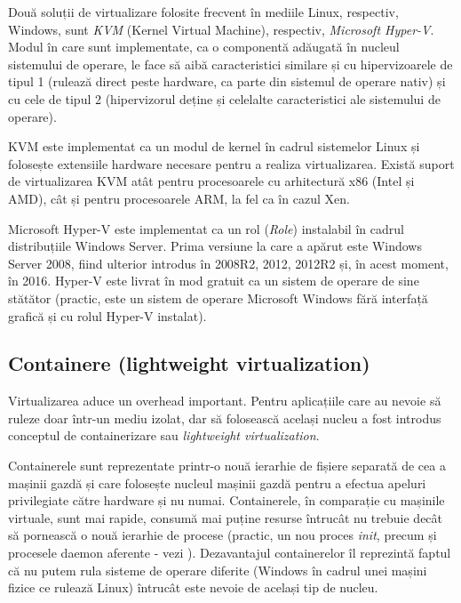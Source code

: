 Două soluții de virtualizare folosite frecvent în mediile Linux,
respectiv, Windows, sunt \textit{KVM}  (Kernel Virtual Machine), respectiv, \textit{Microsoft Hyper-V}.
Modul în care sunt implementate, ca o componentă adăugată în nucleul
sistemului de operare, le face să aibă caracteristici similare și cu
hipervizoarele de tipul 1 (rulează direct peste hardware, ca parte din
sistemul de operare nativ) și cu cele de tipul 2 (hipervizorul deține și celelalte caracteristici ale sistemului de operare).

KVM este implementat ca un modul de kernel în cadrul sistemelor Linux și
folosește extensiile hardware necesare pentru a realiza virtualizarea.
Există suport de virtualizarea KVM atât pentru procesoarele cu
arhitectură x86 (Intel și AMD), cât și pentru procesoarele ARM, la fel ca în cazul Xen.

Microsoft Hyper-V este implementat ca un rol (\textit{Role}) instalabil în cadrul distribuțiile Windows Server.
Prima versiune la care a apărut este Windows Server 2008, fiind ulterior
introdus în 2008R2, 2012, 2012R2 și, în acest moment, în 2016.
Hyper-V este livrat în mod gratuit ca un sistem de operare de sine
stătător (practic, este un sistem de operare Microsoft Windows fără interfață grafică și cu rolul Hyper-V instalat).

\subsection{Containere (lightweight virtualization)}
\label{sec:vm:concepts:containers}

Virtualizarea aduce un overhead important. Pentru aplicațiile care au nevoie să
ruleze doar într-un mediu izolat, dar să folosească același nucleu a
fost introdus conceptul de containerizare sau \textit{lightweight
virtualization}.

Containerele sunt reprezentate printr-o nouă ierarhie de
fișiere separată de cea a mașinii gazdă și care folosește nucleul
mașinii gazdă pentru a efectua apeluri privilegiate către hardware și nu numai.
Containerele, în comparație cu mașinile virtuale, sunt mai rapide, consumă mai
puține resurse întrucât nu trebuie decât să pornească o nouă ierarhie de procese
(practic, un nou proces \textit{init}, precum și procesele daemon aferente - vezi
). Dezavantajul containerelor îl
reprezintă faptul că nu putem rula sisteme de operare diferite (Windows în
cadrul unei mașini fizice ce rulează Linux) întrucât este nevoie de același tip
de nucleu.


